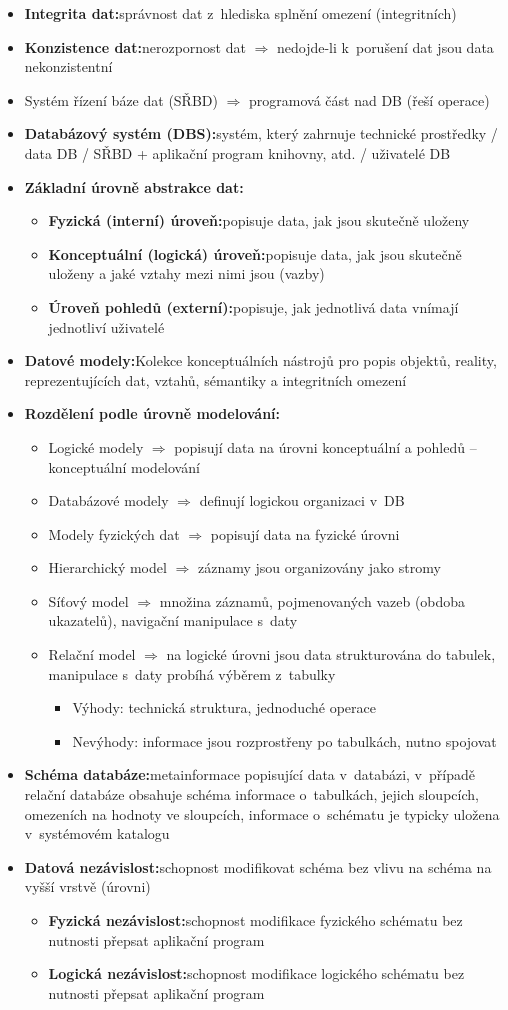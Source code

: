 \documentclass[a4paper,10pt]{article}
\newcommand{\pojem}[2]{\item \textbf{#1:}\quad #2}
\newcommand{\tedy}{$\Rightarrow$ }
\begin{document}
\begin{itemize}
      \pojem{Integrita dat}{správnost dat z~hlediska splnění omezení (integritních)}
      \pojem{Konzistence dat}{nerozpornost dat \tedy nedojde-li k~porušení dat jsou data nekonzistentní}
      \item Systém řízení báze dat (SŘBD) \tedy programová část nad DB (řeší operace)
      \pojem{Databázový systém (DBS)}{systém, který zahrnuje technické prostředky / data DB / SŘBD + aplikační program knihovny, atd. / uživatelé DB}
      \pojem{Základní úrovně abstrakce dat}
      \begin{itemize}
        \pojem{Fyzická (interní) úroveň}{popisuje data, jak jsou skutečně uloženy}
        \pojem{Konceptuální (logická) úroveň}{popisuje data, jak jsou skutečně uloženy a jaké vztahy mezi nimi jsou (vazby)}
        \pojem{Úroveň pohledů (externí)}{popisuje, jak jednotlivá data vnímají jednotliví uživatelé}
      \end{itemize}
      \pojem{Datové modely}{Kolekce konceptuálních nástrojů pro popis objektů, reality, reprezentujících dat, vztahů, sémantiky a integritních omezení}
      \pojem{Rozdělení podle úrovně modelování}
      \begin{itemize}
        \item Logické modely \tedy popisují data na úrovni konceptuální a pohledů -- konceptuální modelování
        \item Databázové modely \tedy definují logickou organizaci v~DB
        \item Modely fyzických dat \tedy popisují data na fyzické úrovni
        \item Hierarchický model \tedy záznamy jsou organizovány jako stromy
        \item Síťový model \tedy množina záznamů, pojmenovaných vazeb (obdoba ukazatelů), navigační manipulace s~daty
        \item Relační model \tedy na logické úrovni jsou data strukturována do tabulek, manipulace s~daty probíhá výběrem z~tabulky
        \begin{itemize}
          \item Výhody: technická struktura, jednoduché operace
          \item Nevýhody: informace jsou rozprostřeny po tabulkách, nutno spojovat
        \end{itemize}
      \end{itemize}

      \pojem{Schéma databáze}{metainformace popisující data v~databázi, v~případě relační databáze obsahuje schéma informace o~tabulkách, jejich sloupcích, omezeních na hodnoty ve sloupcích, informace o~schématu je typicky uložena v~systémovém katalogu}
      \pojem{Datová nezávislost}{schopnost modifikovat schéma bez vlivu na schéma na vyšší vrstvě (úrovni)}
      \begin{itemize}
        \pojem{Fyzická nezávislost}{schopnost modifikace fyzického schématu bez nutnosti přepsat aplikační program}
        \pojem{Logická nezávislost}{schopnost modifikace logického schématu bez nutnosti přepsat aplikační program}
      \end{itemize}
    \end{itemize}
\end{document}
